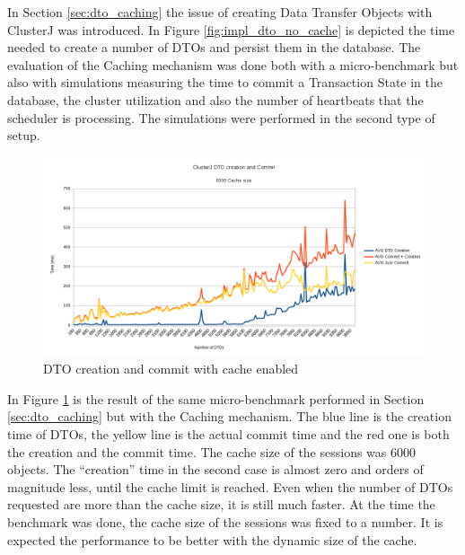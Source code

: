In Section \ref{sec:dto_caching} the issue of
creating Data Transfer Objects with ClusterJ was introduced. In Figure
\ref{fig:impl_dto_no_cache} is depicted the time needed to create a number of
DTOs and persist them in the database. The evaluation of the Caching
mechanism was done both with a micro-benchmark but also with simulations
measuring the time to commit a Transaction State in the database,
the cluster utilization and also the number of heartbeats that the
scheduler is processing. The simulations were performed in the second
type of setup.

\begin{figure}
\centering
\includegraphics[scale=0.5]{resources/images/Evaluation/dto_creation_cache_bench.png}
\caption{DTO creation and commit with cache enabled}
\label{fig:ev_dto_creation_bench}
\end{figure}

In Figure \ref{fig:ev_dto_creation_bench} is the result of the same
micro-benchmark performed in Section \ref{sec:dto_caching} but with
the Caching mechanism. The blue line is the creation time of DTOs, the
yellow line is the actual commit time and the red one is both the
creation and the commit time. The cache size of the sessions was 6000
objects. The ``creation'' time in the second case is almost
zero and orders of magnitude less, until the cache limit is reached. Even when the number of DTOs
requested are more than the cache size, it is still much faster. At
the time the benchmark was done, the cache size of the sessions was
fixed to a number. It is expected the performance to be better with the
dynamic size of the cache.

